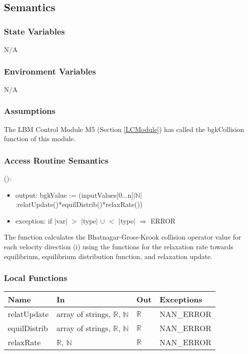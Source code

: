\documentclass[12pt, titlepage]{article}
\begin{document}
\subsection{Semantics}

\subsubsection{State Variables}

N/A

\subsubsection{Environment Variables}

N/A

\subsubsection{Assumptions}

The LBM Control Module M5 (Section \ref{LCModule}) has called the bgkCollision function of this module.

\subsubsection{Access Routine Semantics}

\noindent {}():
\begin{itemize}
	\item output: bgkValue := (inputValues[0...n]$|$$\mathbb{N}$$|$:relatUpdate()*equilDistrib()*relaxRate())
	\item exception: if $|$var$|$ $>$ $|$type$|$ $\cup$ $<$ $|$type$|$ $\Rightarrow$ ERROR
\end{itemize}

The function calculates the Bhatnagar-Gross-Krook collision operator value for each velocity direction (i) using the functions for the relaxation rate towards equilibrium, equilibrium distribution function, and relaxation update.

\subsubsection{Local Functions}

\begin{center}
	\begin{tabular}{p{2cm} p{4cm} p{4cm} p{2cm}}
		\hline
		\textbf{Name} & \textbf{In} & \textbf{Out} & \textbf{Exceptions} \\
		\hline
		relatUpdate & array of strings, $\mathbb{R}$, $\mathbb{N}$ & $\mathbb{R}$ & NAN\_ERROR \\
		equilDistrib & array of strings, $\mathbb{R}$, $\mathbb{N}$ & $\mathbb{R}$ & NAN\_ERROR \\
		relaxRate & $\mathbb{R}$, $\mathbb{N}$ & $\mathbb{R}$ & NAN\_ERROR \\
		\hline
	\end{tabular}
\end{center}
\end{document}
